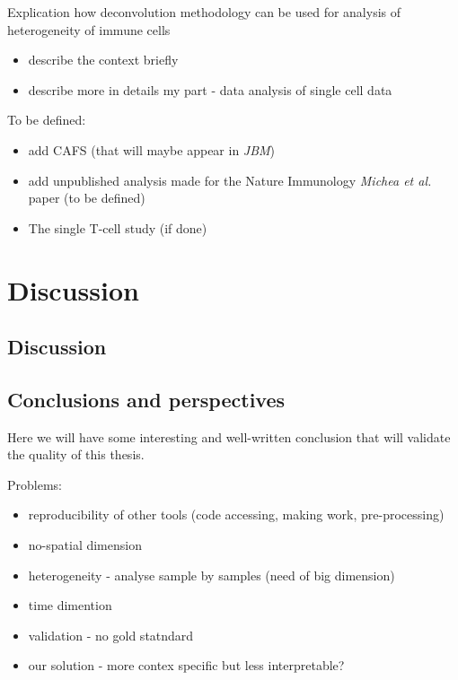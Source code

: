 \documentclass[12pt,]{book}
\providecommand{\tightlist}{%
  \setlength{\itemsep}{0pt}\setlength{\parskip}{0pt}}
\theoremstyle{definition}
\theoremstyle{definition}
\theoremstyle{definition}
\theoremstyle{remark}
\begin{document}
Explication how deconvolution methodology can be used for analysis of
heterogeneity of immune cells

\begin{itemize}
\item
  describe the context briefly
\item
  describe more in details my part - data analysis of single cell data
\end{itemize}

To be defined:

\begin{itemize}
\tightlist
\item
  add CAFS (that will maybe appear in \emph{JBM})
\item
  add unpublished analysis made for the Nature Immunology \emph{Michea
  et al.} paper (to be defined)
\item
  The single T-cell study (if done)
\end{itemize}



\hypertarget{part-discussion}{%
\part{Discussion}\label{part-discussion}}

\hypertarget{discussion}{%
\chapter{Discussion}\label{discussion}}

\hypertarget{conclusions}{%
\chapter{Conclusions and perspectives}\label{conclusions}}

Here we will have some interesting and well-written conclusion that will
validate the quality of this thesis.

Problems:

\begin{itemize}
\item
  reproducibility of other tools (code accessing, making work,
  pre-processing)
\item
  no-spatial dimension
\item
  heterogeneity - analyse sample by samples (need of big dimension)
\item
  time dimention
\item
  validation - no gold statndard
\item
  our solution - more contex specific but less interpretable?
\end{itemize}
\end{document}
